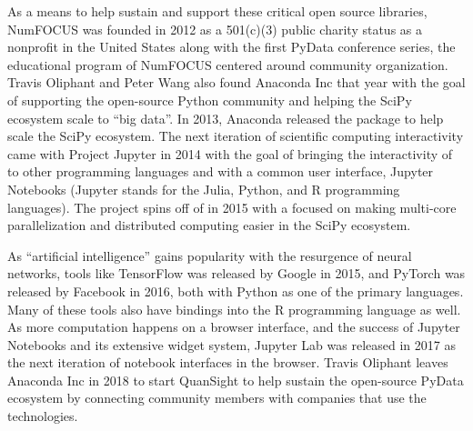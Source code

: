 \documentclass[010-intro.tex]{subfiles}
\begin{document}
        As a means to help sustain and support these critical open source libraries,
        NumFOCUS was founded in 2012 as a 501(c)(3) public charity status as a nonprofit in the United States along with the first PyData
        conference series, the educational program of NumFOCUS centered around community organization.
        Travis Oliphant and Peter Wang also found Anaconda Inc that year
        with the goal of supporting the open-source Python community and helping the SciPy ecosystem scale to ``big data''. %
        In 2013, Anaconda released the  package to help scale the SciPy ecosystem.
        The next iteration of scientific computing interactivity came with Project Jupyter in 2014
        with the goal of bringing the interactivity of  to other programming languages and with a common user interface,
        Jupyter Notebooks (Jupyter stands for the Julia, Python, and R programming languages).
        The  project spins off of  in 2015 with a focused on
        making multi-core parallelization and distributed computing easier in the SciPy ecosystem.

        As ``artificial intelligence'' gains popularity with the resurgence of neural networks,
        tools like TensorFlow was released by Google in 2015,
        and PyTorch was released by Facebook in 2016,
        both with Python as one of the primary languages.
        Many of these tools also have bindings into the R programming language as well.
        As more computation happens on a browser interface, and the success of Jupyter Notebooks and its extensive widget system,
        Jupyter Lab was released in 2017 as the next iteration of notebook interfaces in the browser.
        Travis Oliphant leaves Anaconda Inc in 2018 to start QuanSight to help sustain the open-source PyData ecosystem
        by connecting community members with companies that use the technologies.
\end{document}
